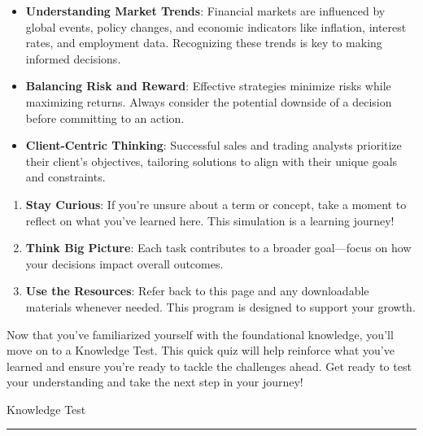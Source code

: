 \documentclass[11pt]{article}
\begin{document}
\begin{itemize}[leftmargin=1.5em, itemsep=2pt]
  \item \textbf{Understanding Market Trends}: Financial markets are influenced
  by global events, policy changes, and economic indicators like inflation,
  interest rates, and employment data. Recognizing these trends is key to
  making informed decisions.
  \item \textbf{Balancing Risk and Reward}: Effective strategies minimize risks
  while maximizing returns. Always consider the potential downside of a
  decision before committing to an action.
  \item \textbf{Client-Centric Thinking}: Successful sales and trading analysts
  prioritize their client's objectives, tailoring solutions to align with
  their unique goals and constraints.
\end{itemize}

\begin{enumerate}[leftmargin=1.5em, itemsep=2pt]
  \item \textbf{Stay Curious}: If you're unsure about a term or concept, take a
  moment to reflect on what you've learned here. This simulation is a learning
  journey!
  \item \textbf{Think Big Picture}: Each task contributes to a broader
  goal---focus on how your decisions impact overall outcomes.
  \item \textbf{Use the Resources}: Refer back to this page and any
  downloadable materials whenever needed. This program is designed to support
  your growth.
\end{enumerate}

Now that you've familiarized yourself with the foundational knowledge, you'll
move on to a Knowledge Test. This quick quiz will help reinforce what you've
learned and ensure you're ready to tackle the challenges ahead. Get ready to
test your understanding and take the next step in your journey!

\newpage
{\fontsize{26}{30}\selectfont Knowledge Test}\par\medskip
{\color{rulegray}\rule{\linewidth}{0.6pt}}\par

\end{document}
